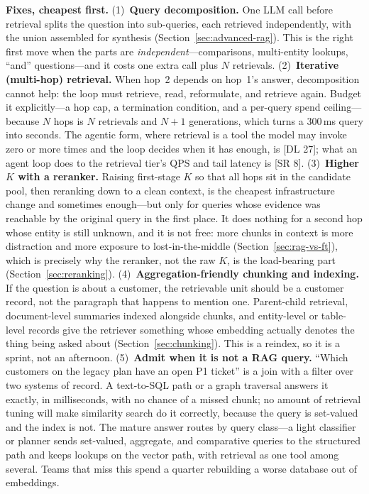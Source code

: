 \begin{interviewq}
\textbf{Fixes, cheapest first.}
(1)~\textbf{Query decomposition.}  One LLM call before retrieval splits the
question into sub-queries, each retrieved independently, with the union
assembled for synthesis (Section~\ref{sec:advanced-rag}).  This is the right
first move when the parts are \emph{independent}---comparisons, multi-entity
lookups, ``and'' questions---and it costs one extra call plus $N$ retrievals.
(2)~\textbf{Iterative (multi-hop) retrieval.}  When hop~2 depends on hop~1's
answer, decomposition cannot help: the loop must retrieve, read, reformulate,
and retrieve again.  Budget it explicitly---a hop cap, a termination
condition, and a per-query spend ceiling---because $N$ hops is $N$ retrievals
and $N{+}1$ generations, which turns a 300\,ms query into seconds.  The
agentic form, where retrieval is a tool the model may invoke zero or more
times and the loop decides when it has enough, is [DL 27]; what an agent loop
does to the retrieval tier's QPS and tail latency is [SR 8].
(3)~\textbf{Higher $K$ with a reranker.}  Raising first-stage $K$ so that all
hops sit in the candidate pool, then reranking down to a clean context, is the
cheapest infrastructure change and sometimes enough---but only for queries
whose evidence was reachable by the original query in the first place.  It
does nothing for a second hop whose entity is still unknown, and it is not
free: more chunks in context is more distraction and more exposure to
lost-in-the-middle (Section~\ref{sec:rag-vs-ft}), which is precisely why the
reranker, not the raw $K$, is the load-bearing part
(Section~\ref{sec:reranking}).
(4)~\textbf{Aggregation-friendly chunking and indexing.}  If the question is
about a customer, the retrievable unit should be a customer record, not the
paragraph that happens to mention one.  Parent-child retrieval, document-level
summaries indexed alongside chunks, and entity-level or table-level records
give the retriever something whose embedding actually denotes the thing being
asked about (Section~\ref{sec:chunking}).  This is a reindex, so it is a
sprint, not an afternoon.
(5)~\textbf{Admit when it is not a RAG query.}  ``Which customers on the
legacy plan have an open P1 ticket'' is a join with a filter over two systems
of record.  A text-to-SQL path or a graph traversal answers it exactly, in
milliseconds, with no chance of a missed chunk; no amount of retrieval tuning
will make similarity search do it correctly, because the query is set-valued
and the index is not.  The mature answer routes by query class---a light
classifier or planner sends set-valued, aggregate, and comparative queries to
the structured path and keeps lookups on the vector path, with retrieval as
one tool among several.  Teams that miss this spend a quarter rebuilding a
worse database out of embeddings.


\end{interviewq}

